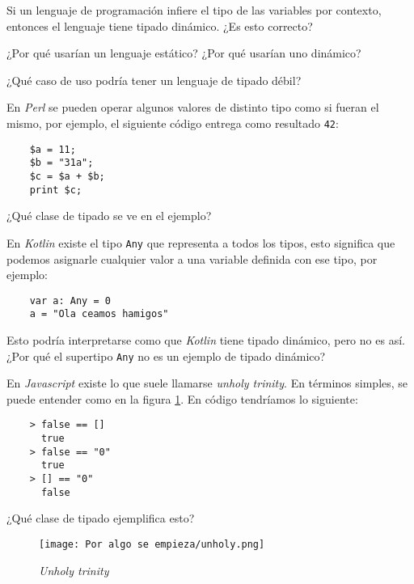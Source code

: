 \begin{exercise}
  Si un lenguaje de programación infiere el tipo de las variables por contexto, entonces el 
  lenguaje tiene tipado dinámico.
  ¿Es esto correcto?
\end{exercise}

\begin{exercise}
  ¿Por qué usarían un lenguaje estático?
  ¿Por qué usarían uno dinámico?
\end{exercise}

\begin{exercise}
  ¿Qué caso de uso podría tener un lenguaje de tipado débil?
\end{exercise}

\begin{exercise}
  En \textit{Perl} se pueden operar algunos valores de distinto tipo como si fueran el mismo,
  por ejemplo, el siguiente código entrega como resultado \texttt{42}:
  \begin{verbatim}
    $a = 11;
    $b = "31a";
    $c = $a + $b;
    print $c;
  \end{verbatim}

  ¿Qué clase de tipado se ve en el ejemplo?
\end{exercise}

\begin{exercise}
  En \textit{Kotlin} existe el tipo \texttt{Any} que representa a todos los tipos, 
  esto significa que podemos asignarle cualquier valor a una variable definida con ese tipo, por
  ejemplo:

  \begin{verbatim}
    var a: Any = 0
    a = "Ola ceamos hamigos"
  \end{verbatim}

  Esto podría interpretarse como que \textit{Kotlin} tiene tipado dinámico, pero no es así.
  ¿Por qué el supertipo \texttt{Any} no es un ejemplo de tipado dinámico?
\end{exercise}

\begin{exercise}
  En \textit{Javascript} existe lo que suele llamarse \textit{unholy trinity}.
  En términos simples, se puede entender como en la figura \ref{fig:unholy}.
  En código tendríamos lo siguiente:
  \begin{verbatim}
    > false == [] 
      true
    > false == "0"
      true
    > [] == "0"
      false
  \end{verbatim}

  ¿Qué clase de tipado ejemplifica esto?
\end{exercise}

\begin{figure}[ht!]
  \centering
  \texttt{[image: Por algo se empieza/unholy.png]}
  \caption{\textit{Unholy trinity}}
  \label{fig:unholy}
\end{figure}